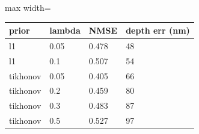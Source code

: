 \begin{center}\begin{minipage}{\linewidth}\centering
{}
\begin{adjustbox}{max width=\linewidth}
\begin{tabular}{llll}
\toprule
prior & lambda & NMSE & depth err (nm) \\
\midrule
l1 & 0.05 & 0.478 & 48 \\
l1 & 0.1 & 0.507 & 54 \\
tikhonov & 0.05 & 0.405 & 66 \\
tikhonov & 0.2 & 0.459 & 80 \\
tikhonov & 0.3 & 0.483 & 87 \\
tikhonov & 0.5 & 0.527 & 97 \\
\bottomrule
\end{tabular}\end{adjustbox}\end{minipage}\end{center}
